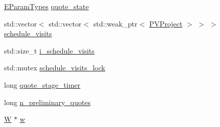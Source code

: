 {\bf }\par
\begin{DoxyCompactItemize}
\item 
\hyperlink{namespacesolar__core_aa1147341e5ef7a40d68d1bd68e149362}{E\+Param\+Types} \hyperlink{classsolar__core_1_1_household_a4ae618de9a28895317824b185b57ab24}{quote\+\_\+state}
\item 
std\+::vector$<$ std\+::vector$<$ std\+::weak\+\_\+ptr$<$ \hyperlink{classsolar__core_1_1_p_v_project}{P\+V\+Project} $>$ $>$ $>$ \hyperlink{classsolar__core_1_1_household_aadd4e3e2fc66ed214bcfadf37f557b14}{schedule\+\_\+visits}
\item 
std\+::size\+\_\+t \hyperlink{classsolar__core_1_1_household_a077c668f06c009a43c535f1ad92cf92e}{i\+\_\+schedule\+\_\+visits}
\item 
std\+::mutex \hyperlink{classsolar__core_1_1_household_a15e598cfc419040a23f75fe08a8ef1d8}{schedule\+\_\+visits\+\_\+lock}
\item 
long \hyperlink{classsolar__core_1_1_household_a6b35426fd691daa6d352ec34a6ec6e4d}{quote\+\_\+stage\+\_\+timer}
\item 
long \hyperlink{classsolar__core_1_1_household_aedfc08b7837a3e2fa6ad9e62309694f3}{n\+\_\+preliminary\+\_\+quotes}
\end{DoxyCompactItemize}

{\bf }\par
\begin{DoxyCompactItemize}
\item 
\hyperlink{classsolar__core_1_1_w}{W} $\ast$ \hyperlink{classsolar__core_1_1_household_a01ac4643c725f397ba7485209a906e4d}{w}
\end{DoxyCompactItemize}

